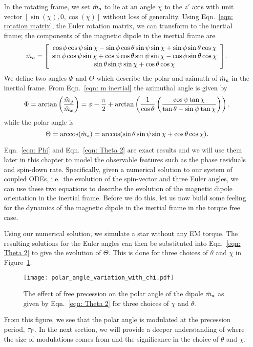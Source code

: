 \documentclass[../full_thesis/full_thesis.tex]{subfiles}
\begin{document}
In the rotating frame, we set $\hat{m}_a$ to lie at an angle $\chi$ to the $z'$ axis
with unit vector $[\sin(\chi), 0, \cos(\chi)]$ without loss of generality.
Using Eqn.~\eqref{eqn: rotation matrix}, the Euler
rotation matrix, we can transform to the inertial frame; the components of the
magnetic dipole in the inertial frame are
\begin{equation}
\hat{m}_a =
\left[\begin{array}{c}
\cos\phi\cos\psi\sin\chi - \sin\phi \cos \theta \sin \psi \sin \chi
+ \sin \phi \sin \theta \cos \chi \\
\sin\phi\cos\psi\sin\chi + \cos\phi \cos \theta \sin \psi \sin \chi
- \cos \phi \sin \theta \cos \chi \\
\sin\theta \sin\psi \sin\chi + \cos\theta \cos \chi
\end{array}\right].
\label{eqn: m inertial}
\end{equation}
We define two angles $\Phi$ and $\Theta$
which describe the polar and azimuth of $\hat{m}_a$ in the inertial frame.
From Eqn.~\eqref{eqn: m inertial} the azimuthal angle is given by
\begin{equation}
    \Phi = \arctan\left(\frac{\hat{m}_{y}}{\hat{m}_{x}}\right) =
\phi - \frac{\pi}{2} + \arctan\left(\frac{1}{\cos\theta}
                       \left(\frac{\cos\psi \tan \chi}{\tan\theta -
                       \sin \psi \tan\chi }\right)\right),
\label{eqn: Phi}
\end{equation}
while the polar angle is
\begin{equation}
\Theta = \arccos(\hat{m}_{z}) = \arccos(\sin \theta \sin \psi \sin \chi + \cos \theta \cos \chi ).
\label{eqn: Theta 2}
\end{equation}

Eqn.~\eqref{eqn: Phi} and Eqn.~\eqref{eqn: Theta 2} are exact results and
we will use them later in this chapter to model the observable features such
as the phase residuals and spin-down rate.
Specifically, given a numerical solution to our system of coupled ODEs, i.e.\ the evolution of the spin-vector and three Euler angles, we can use these two
equations to describe the evolution of the magnetic dipole orientation in the
inertial frame. Before we do this, let us now build some feeling for the dynamics of
the magnetic dipole in the inertial frame in the torque free case.

Using our numerical solution, we simulate a star without any EM torque. The
resulting solutions for the Euler angles can then be substituted into Eqn.~\eqref{eqn: Theta 2}
to give the evolution of $\Theta$. This is done for three choices of $\theta$
and $\chi$ in Figure~\ref{fig: polar angle variations}.
\begin{figure}[htb]
\centering
  \texttt{[image: polar\_angle\_variation\_with\_chi.pdf]}
\caption{The effect of free precession on the polar angle of the dipole $\hat{m}_a$
as given by Eqn.~\eqref{eqn: Theta 2} for three choices of $\chi$ and
$\theta$.}
\label{fig: polar angle variations}
\end{figure}
From this figure, we see that the polar angle is modulated at the precession
period, $\tau_{\mathrm{P}}$. In the next section, we will provide a deeper understanding
of where the size of modulations comes from and the significance in the choice
of $\theta$ and $\chi$.
\end{document}
